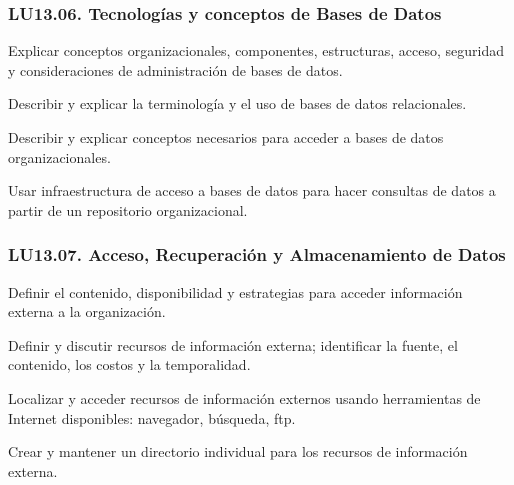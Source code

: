 \subsubsection{LU13.06. Tecnologías y conceptos de Bases de Datos}\label{sec:LU13.06}
\begin{LearningUnit}
\begin{LUGoal}
\item Explicar conceptos organizacionales, componentes, estructuras, acceso, seguridad y consideraciones de administración de bases de datos.
\end{LUGoal}

\begin{LUObjective}
\item Describir y explicar la terminología y el uso de bases de datos relacionales.
\item Describir y explicar conceptos necesarios para acceder a bases de datos organizacionales.
\item Usar infraestructura de acceso a bases de datos para hacer consultas de datos a partir de un repositorio organizacional.
\end{LUObjective}
\end{LearningUnit}

\subsubsection{LU13.07. Acceso, Recuperación y Almacenamiento de Datos}\label{sec:LU13.07}
\begin{LearningUnit}
\begin{LUGoal}
\item Definir el contenido, disponibilidad y estrategias para acceder información externa a la organización.
\end{LUGoal}

\begin{LUObjective}
\item Definir y discutir recursos de información externa; identificar la fuente, el contenido, los costos y la temporalidad.
\item Localizar y acceder recursos de información externos usando herramientas de Internet disponibles: navegador, búsqueda, ftp.
\item Crear y mantener un directorio individual para los recursos de información externa.
\end{LUObjective}
\end{LearningUnit}

